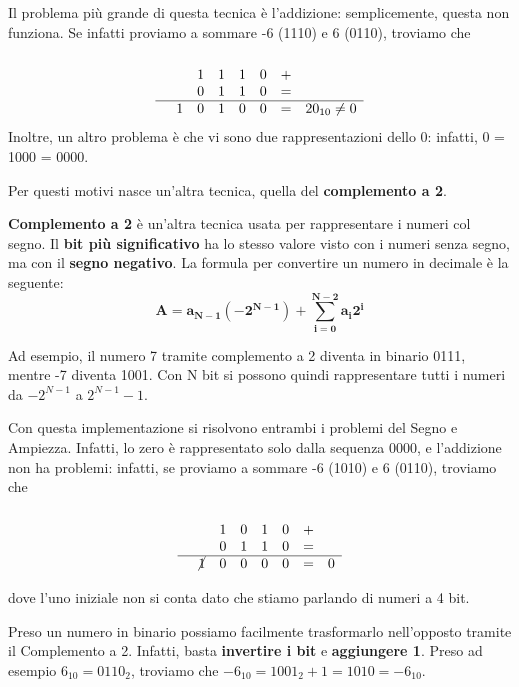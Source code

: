 \documentclass[11pt, a4paper, titlepage, oneside]{scrbook}
\begin{document}
Il problema più grande di questa tecnica è l'addizione: semplicemente, questa non funziona. Se infatti proviamo a sommare -6 (1110) e 6 (0110), troviamo che
\[
\begin{array}{rccccccc}
& & & & & & \\
& & 1 & 1 & 1 & 0 & + &\\
& & 0 & 1 & 1 & 0 & = &\\
\hline
& 1 & 0 & 1 & 0 & 0& = & 20_{10} \neq 0
\end{array}
\]
Inoltre, un altro problema è che vi sono due rappresentazioni dello 0: infatti, 0 = 1000 = 0000. 

Per questi motivi nasce un'altra tecnica, quella del \textbf{complemento a 2}.

\begin{Proprieta}[Complemento a 2]
\label{prop-complemento a 2}
\textbf{Complemento a 2} è un'altra tecnica usata per rappresentare i numeri col segno. Il \textbf{bit più significativo} ha lo stesso valore visto con i numeri senza segno, ma con il \textbf{segno negativo}. La formula per convertire un numero in decimale è la seguente:
\[
\bm{A = a_{N-1}(-2^{N-1}) + \sum_{i = 0}^{N-2} a_i2^i}
\]
\end{Proprieta}

Ad esempio, il numero 7 tramite complemento a 2 diventa in binario 0111, mentre -7 diventa 1001. Con N bit si possono quindi rappresentare tutti i numeri da $-2^{N-1}$ a $2^{N-1} - 1$. 

Con questa implementazione si risolvono entrambi i problemi del Segno e Ampiezza. Infatti, lo zero è rappresentato solo dalla sequenza 0000, e l'addizione non ha problemi: infatti, se proviamo a sommare -6 (1010) e 6 (0110), troviamo che
\[
\begin{array}{rccccccc}
& & & & & & \\
& & 1 & 0 & 1 & 0 & + &\\
& & 0 & 1 & 1 & 0 & = &\\
\hline
& \cancel{1} & 0 & 0 & 0 & 0& = & 0
\end{array}
\]

dove l'uno iniziale non si conta dato che stiamo parlando di numeri a 4 bit.

\begin{Proprieta}
\label{prop-trasformare-complemento-2}
Preso un numero in binario possiamo facilmente trasformarlo nell'opposto tramite il Complemento a 2. Infatti, basta \textbf{invertire i bit} e \textbf{aggiungere 1}. Preso ad esempio $6_{10} = 0110_{2}$, troviamo che $-6_{10} = 1001_2 + 1 = 1010 = -6_{10}$.
\end{Proprieta}
\end{document}
